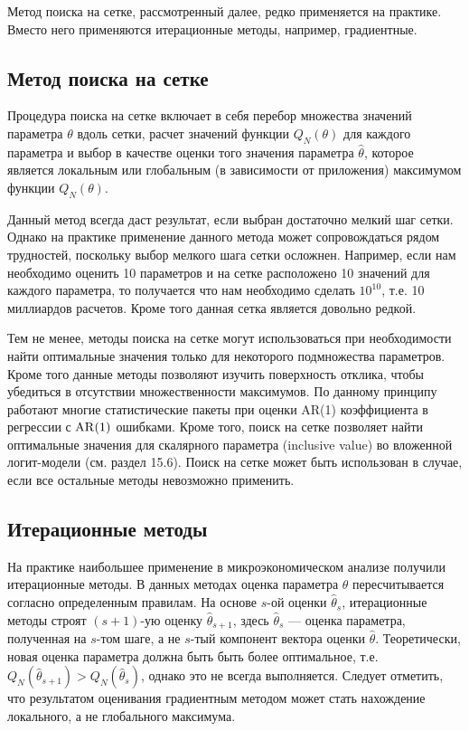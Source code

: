 Метод поиска на сетке, рассмотренный далее, редко применяется на практике. Вместо него применяются итерационные методы, например, градиентные.

\subsection{Метод поиска на сетке}

Процедура поиска на сетке включает в себя перебор множества значений параметра $\theta$ вдоль сетки, расчет значений функции $Q_N(\theta)$ для каждого параметра и выбор в качестве оценки того значения параметра $\hat{\theta}$, которое является локальным или глобальным (в зависимости от приложения) максимумом функции $Q_N(\theta)$. 

Данный метод всегда даст результат, если выбран достаточно мелкий шаг сетки. Однако на практике применение данного метода может сопровождаться рядом трудностей, поскольку выбор мелкого шага сетки осложнен. Например, если нам необходимо оценить 10 параметров и на сетке расположено 10 значений для каждого параметра, то получается что нам необходимо сделать $10^{10}$, т.е. 10 миллиардов расчетов. Кроме того данная сетка является довольно редкой.

Тем не менее, методы поиска на сетке могут использоваться при необходимости найти оптимальные значения только для некоторого подмножества параметров. Кроме того данные методы позволяют изучить поверхность отклика, чтобы убедиться в отсутствии множественности максимумов. По данному принципу работают многие статистические пакеты при оценки AR(1) коэффициента в регрессии с $\mathrm{AR}(1)$ ошибками. Кроме того, поиск на сетке позволяет найти оптимальные значения для скалярного параметра (inclusive value) во вложенной логит-модели (см. раздел 15.6). Поиск на сетке может быть использован в случае, если все остальные методы невозможно применить.

\subsection{Итерационные методы}

На практике наибольшее применение в микроэкономическом анализе получили итерационные методы. В данных методах оценка параметра $\theta$ пересчитывается согласно определенным правилам. На основе  $s$-ой оценки $\hat{\theta}_s$, итерационные методы строят $(s+1)$-ую оценку $\hat{\theta}_{s+1}$, здесь $\hat{\theta}_s$ --- оценка параметра, полученная на $s$-том шаге, а не $s$-тый компонент вектора оценки $\hat{\theta}$. Теоретически, новая оценка параметра должна быть быть более оптимальное, т.е. $Q_N(\hat{\theta}_{s+1})>Q_N(\hat{\theta}_{s})$, однако это не всегда выполняется. Следует отметить, что результатом оценивания градиентным методом может стать нахождение локального, а не глобального максимума.

